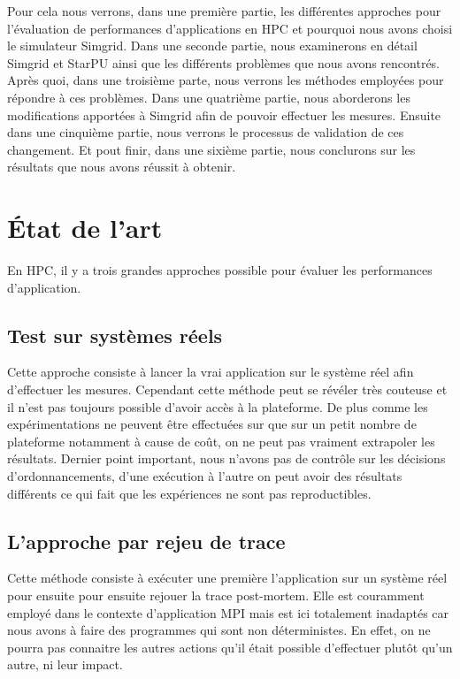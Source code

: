 \documentclass[smallextended]{svjour3}
\begin{document}
Pour cela nous verrons, dans une première partie, les différentes
approches pour l'évaluation de performances d'applications en HPC et
pourquoi nous avons choisi le simulateur Simgrid. Dans une seconde
partie, nous examinerons en détail Simgrid et StarPU ainsi que les
différents problèmes que nous avons rencontrés. Après quoi, dans une
troisième parte, nous verrons les méthodes employées pour répondre à
ces problèmes. Dans une quatrième partie, nous aborderons les
modifications apportées à Simgrid afin de pouvoir effectuer les
mesures. Ensuite dans une cinquième partie, nous verrons le
processus de validation de ces changement. Et pout finir, dans une
sixième partie, nous conclurons sur les résultats que nous avons
réussit à obtenir. 

\section{État de l'art}
\label{sec-2}
En HPC, il y a trois grandes approches possible pour évaluer les
performances d'application.
\subsection{Test sur systèmes réels}
\label{sec-2-1}
Cette approche consiste à lancer la vrai application sur le système
réel afin d'effectuer les mesures. Cependant cette méthode peut se 
révéler très couteuse et il n'est pas toujours possible d'avoir
accès à la plateforme. De plus comme les expérimentations ne
peuvent être effectuées sur que sur un petit nombre de plateforme
notamment à cause de coût, on ne peut pas vraiment extrapoler les
résultats. Dernier point important, nous n'avons pas de contrôle
sur les décisions d'ordonnancements, d'une exécution à l'autre on
peut avoir des résultats différents ce qui fait que les
expériences ne sont pas reproductibles. 
\subsection{L'approche par rejeu de trace}
\label{sec-2-2}
Cette méthode consiste à exécuter une première l'application sur
un système réel pour ensuite pour ensuite rejouer la trace
post-mortem. Elle est couramment employé dans le contexte
d'application MPI mais est ici totalement inadaptés car nous avons
à faire des programmes qui sont non déterministes. En effet, on ne
pourra pas connaitre les autres actions qu'il était possible
d'effectuer plutôt qu'un autre, ni leur impact.
\end{document}
